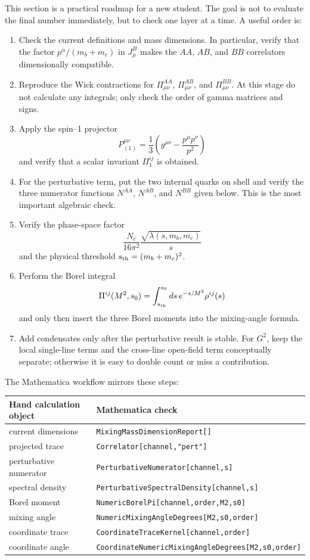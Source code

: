 \documentclass[11pt]{article}
\begin{document}
This section is a practical roadmap for a new student.  The goal is not to
evaluate the final number immediately, but to check one layer at a time.  A
useful order is:
\begin{enumerate}
  \item Check the current definitions and mass dimensions.  In particular,
  verify that the factor \(p^\alpha/(m_b+m_c)\) in \(J^B_\mu\) makes the
  \(AA\), \(AB\), and \(BB\) correlators dimensionally compatible.
  \item Reproduce the Wick contractions for \(\Pi_{\mu\nu}^{AA}\),
  \(\Pi_{\mu\nu}^{AB}\), and \(\Pi_{\mu\nu}^{BB}\).  At this stage do not
  calculate any integrals; only check the order of gamma matrices and signs.
  \item Apply the spin--1 projector
  \[
    P^{\mu\nu}_{(1)}
    =
    \frac{1}{3}
    \left(g^{\mu\nu}-\frac{p^\mu p^\nu}{p^2}\right)
  \]
  and verify that a scalar invariant \(\Pi_1^{ij}\) is obtained.
  \item For the perturbative term, put the two internal quarks on shell and
  verify the three numerator functions \(N^{AA}\), \(N^{AB}\), and \(N^{BB}\)
  given below.  This is the most important algebraic check.
  \item Verify the phase-space factor
  \[
    \frac{N_c}{16\pi^2}
    \frac{\sqrt{\lambda(s,m_b,m_c)}}{s}
  \]
  and the physical threshold \(s_{\rm th}=(m_b+m_c)^2\).
  \item Perform the Borel integral
  \[
    \Pi^{ij}(M^2,s_0)
    =
    \int_{s_{\rm th}}^{s_0}ds\,e^{-s/M^2}\rho^{ij}(s)
  \]
  and only then insert the three Borel moments into the mixing-angle formula.
  \item Add condensates only after the perturbative result is stable.  For
  \(G^2\), keep the local single-line terms and the cross-line open-field
  term conceptually separate; otherwise it is easy to double count or miss a
  contribution.
\end{enumerate}

The Mathematica workflow mirrors these steps:
\begin{center}
\begin{tabular}{ll}
Hand calculation object & Mathematica check \\
\hline
current dimensions & \texttt{MixingMassDimensionReport[]} \\
projected trace & \texttt{Correlator[channel,"pert"]} \\
perturbative numerator & \texttt{PerturbativeNumerator[channel,s]} \\
spectral density & \texttt{PerturbativeSpectralDensity[channel,s]} \\
Borel moment & \texttt{NumericBorelPi[channel,order,M2,s0]} \\
mixing angle & \texttt{NumericMixingAngleDegrees[M2,s0,order]} \\
coordinate trace & \texttt{CoordinateTraceKernel[channel,order]} \\
coordinate angle & \texttt{CoordinateNumericMixingAngleDegrees[M2,s0,order]} \\
\end{tabular}
\end{center}
\end{document}

